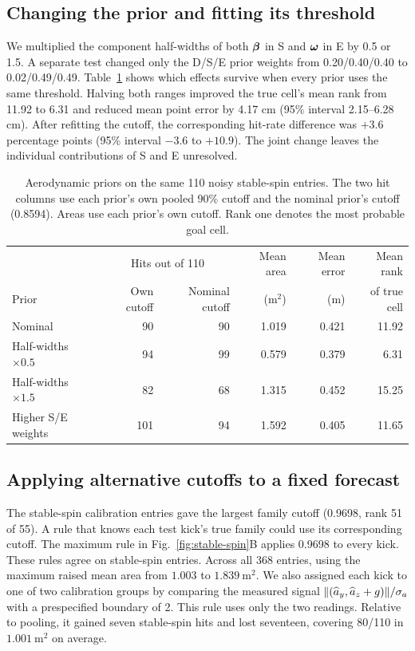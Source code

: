 \subsection{Changing the prior and fitting its threshold}
We multiplied the component half-widths of both \(\boldsymbol{\beta}\) in S and \(\boldsymbol{\omega}\) in E by 0.5 or 1.5. A separate test changed only the D/S/E prior weights from 0.20/0.40/0.40 to 0.02/0.49/0.49. Table~\ref{tab:spin-priors} shows which effects survive when every prior uses the same threshold. Halving both ranges improved the true cell's mean rank from 11.92 to 6.31 and reduced mean point error by 4.17 cm (95\% interval 2.15--6.28 cm). After refitting the cutoff, the corresponding hit-rate difference was \(+3.6\) percentage points (95\% interval \(-3.6\) to \(+10.9\)). The joint change leaves the individual contributions of S and E unresolved.

\begin{table}[htbp]\centering\small
\caption{Aerodynamic priors on the same 110 noisy stable-spin entries. The two hit columns use each prior's own pooled 90\% cutoff and the nominal prior's cutoff (0.8594). Areas use each prior's own cutoff. Rank one denotes the most probable goal cell.}
\label{tab:spin-priors}
\begin{tabular}{@{}lrrrrr@{}}\toprule
 & \multicolumn{2}{c}{Hits out of 110} & Mean area & Mean error & Mean rank\\
Prior & Own cutoff & Nominal cutoff & (m\(^2\)) & (m) & of true cell\\\midrule
Nominal & 90 & 90 & 1.019 & 0.421 & 11.92\\
Half-widths \(\times 0.5\) & 94 & 99 & 0.579 & 0.379 & 6.31\\
Half-widths \(\times 1.5\) & 82 & 68 & 1.315 & 0.452 & 15.25\\
Higher S/E weights & 101 & 94 & 1.592 & 0.405 & 11.65\\\bottomrule
\end{tabular}
\end{table}

\subsection{Applying alternative cutoffs to a fixed forecast}
The stable-spin calibration entries gave the largest family cutoff (0.9698, rank 51 of 55). A rule that knows each test kick's true family could use its corresponding cutoff. The maximum rule in Fig.~\ref{fig:stable-spin}B applies 0.9698 to every kick. These rules agree on stable-spin entries. Across all 368 entries, using the maximum raised mean area from \(1.003\) to \(1.839\ \mathrm{m^2}\). We also assigned each kick to one of two calibration groups by comparing the measured signal \(\lVert (\widehat a_y,\widehat a_z+g)\rVert/\sigma_a\) with a prespecified boundary of 2. This rule uses only the two readings. Relative to pooling, it gained seven stable-spin hits and lost seventeen, covering 80/110 in \(1.001\ \mathrm{m^2}\) on average.

